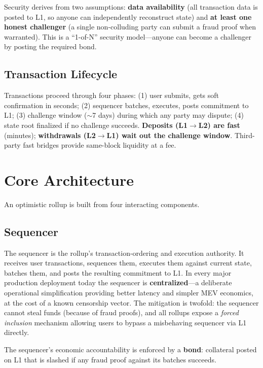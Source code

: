 \documentclass[11pt,letterpaper]{article}
\begin{document}
Security derives from two assumptions: \textbf{data availability} (all transaction data is posted to L1, so anyone can independently reconstruct state) and \textbf{at least one honest challenger} (a single non-colluding party can submit a fraud proof when warranted). This is a ``1-of-N'' security model---anyone can become a challenger by posting the required bond.

\subsection{Transaction Lifecycle}

Transactions proceed through four phases: (1) user submits, gets soft confirmation in seconds; (2) sequencer batches, executes, posts commitment to L1; (3) challenge window ($\sim$7 days) during which any party may dispute; (4) state root finalized if no challenge succeeds. \textbf{Deposits (L1$\to$L2) are fast} (minutes); \textbf{withdrawals (L2$\to$L1) wait out the challenge window}. Third-party fast bridges provide same-block liquidity at a fee.

\section{Core Architecture}

An optimistic rollup is built from four interacting components.

\subsection{Sequencer}

The sequencer is the rollup's transaction-ordering and execution authority. It receives user transactions, sequences them, executes them against current state, batches them, and posts the resulting commitment to L1. In every major production deployment today the sequencer is \textbf{centralized}---a deliberate operational simplification providing better latency and simpler MEV economics, at the cost of a known censorship vector. The mitigation is twofold: the sequencer cannot steal funds (because of fraud proofs), and all rollups expose a \emph{forced inclusion} mechanism allowing users to bypass a misbehaving sequencer via L1 directly.

The sequencer's economic accountability is enforced by a \textbf{bond}: collateral posted on L1 that is slashed if any fraud proof against its batches succeeds.
\end{document}
